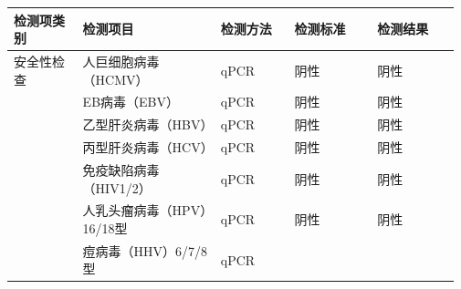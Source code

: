 \documentclass[UTF8,10pt,a4paper,fontset=fandol]{ctexart}
\newcommand{\fieldvalue}[1]{#1}
\begin{document}
\small
\begin{tabular}{|p{0.15\linewidth}|p{0.30\linewidth}|p{0.16\linewidth}|p{0.18\linewidth}|p{0.18\linewidth}|}
\hline
检测项类别 & 检测项目 & 检测方法 & 检测标准 & 检测结果 \\ \hline
安全性检查 &
\fieldvalue{人巨细胞病毒（HCMV）} &
\fieldvalue{qPCR} &
\fieldvalue{阴性} &
\fieldvalue{阴性}
\\ \hline
&
\fieldvalue{EB病毒（EBV）} &
\fieldvalue{qPCR} &
\fieldvalue{阴性} &
\fieldvalue{阴性}
\\ \hline
&
\fieldvalue{乙型肝炎病毒（HBV）} &
\fieldvalue{qPCR} &
\fieldvalue{阴性} &
\fieldvalue{阴性}
\\ \hline
&
\fieldvalue{丙型肝炎病毒（HCV）} &
\fieldvalue{qPCR} &
\fieldvalue{阴性} &
\fieldvalue{阴性}
\\ \hline
&
\fieldvalue{免疫缺陷病毒（HIV1/2）} &
\fieldvalue{qPCR} &
\fieldvalue{阴性} &
\fieldvalue{阴性}
\\ \hline
&
\fieldvalue{人乳头瘤病毒（HPV）16/18型} &
\fieldvalue{qPCR} &
\fieldvalue{阴性} &
\fieldvalue{阴性}
\\ \hline
&
\fieldvalue{痘病毒（HHV）6/7/8型} &
\fieldvalue{qPCR} &

\end{tabular}
\end{document}
